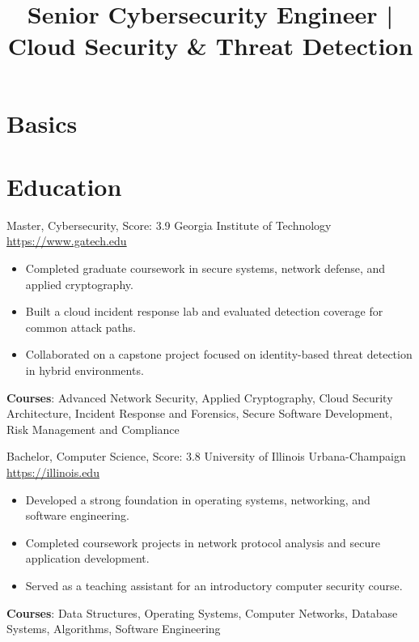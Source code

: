 \documentclass[a4paper, serif, 10pt]{moderncv}
\title{Senior Cybersecurity Engineer | Cloud Security \& Threat Detection}
\begin{document}
\maketitle

\section{Basics}

\section{Education}

        {Master, Cybersecurity, Score: 3.9}
        {Georgia Institute of Technology}
        {\url{https://www.gatech.edu}}
        {}
        {\begin{itemize}
\item Completed graduate coursework in secure systems, network defense, and applied cryptography.
\item Built a cloud incident response lab and evaluated detection coverage for common attack paths.
\item Collaborated on a capstone project focused on identity-based threat detection in hybrid environments.
\end{itemize}
\textbf{Courses}: Advanced Network Security, Applied Cryptography, Cloud Security Architecture, Incident Response and Forensics, Secure Software Development, Risk Management and Compliance}

        {Bachelor, Computer Science, Score: 3.8}
        {University of Illinois Urbana-Champaign}
        {\url{https://illinois.edu}}
        {}
        {\begin{itemize}
\item Developed a strong foundation in operating systems, networking, and software engineering.
\item Completed coursework projects in network protocol analysis and secure application development.
\item Served as a teaching assistant for an introductory computer security course.
\end{itemize}
\textbf{Courses}: Data Structures, Operating Systems, Computer Networks, Database Systems, Algorithms, Software Engineering}
\end{document}
